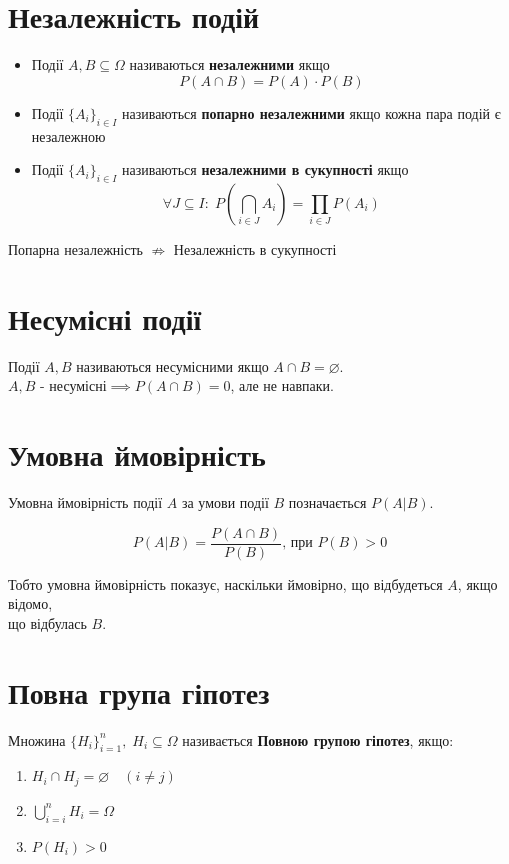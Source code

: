 \documentclass[11pt, a4paper]{article} %
\begin{document}
\section*{Незалежність подій}
\begin{itemize}
    \item Події $A,B \subseteq \Omega$ називаються \textbf{незалежними} якщо
    $$P(A\cap B) = P(A)\cdot P(B)$$
    
    \item Події $\{A_i\}_{i\in I}$ називаються \textbf{попарно незалежними} якщо 
    кожна пара подій є незалежною
    
    \item Події $\{A_i\}_{i\in I}$ називаються \textbf{незалежними в сукупності} якщо
    $$\forall J\subseteq I:\; P(\bigcap_{i\in J}A_i) = \prod_{i\in J}P(A_i)$$
\end{itemize}

\begin{mdframed}
    Попарна незалежність $\nRightarrow$ Незалежність в сукупності
\end{mdframed}

\section*{Несумісні події}
Події $A, B$ називаються несумісними якщо $A\cap B = \varnothing$. \\
$A,B \text{ - несумісні} \implies P(A\cap B) = 0$, але не навпаки. 

\pagebreak
\section*{Умовна ймовірність}
Умовна ймовірність події $A$ за умови події $B$ позначається $P(A|B)$.
\begin{mdframed}
    $$P(A|B) = \frac{P(A\cap B)}{P(B)} \text{, при } P(B) > 0$$
\end{mdframed}

Тобто умовна ймовірність показує, наскільки ймовірно, що відбудеться $A$, якщо відомо, \\
що відбулась $B$.

\section*{Повна група гіпотез}
Множина $\{H_i\}_{i=1}^n, \; H_i \subseteq \Omega$ називається 
\textbf{Повною групою гіпотез}, якщо:
\begin{enumerate}
    \item $H_i \cap H_j = \varnothing \quad (i\ne j)$
    \item $\displaystyle\bigcup_{i=i}^n H_i = \Omega$
    \item $P(H_i) > 0$
\end{enumerate}
\end{document}
